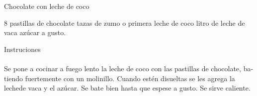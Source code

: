 \documentclass{article}
\begin{document}
  {\noindent \huge Chocolate con leche de coco}
  \vspace{1cm}

  \begin{multicols}{2}
  \noindent \color{light}
      8 pastillas de chocolate tazas de zumo o primera leche de coco litro de leche de vaca\newline
      azúcar a gusto.\newline
    \end{multicols}
  \vspace{1cm}

  {\noindent \LARGE Instruciones}\\
  \\
  \noindent \color{light} Se pone a cocinar a fuego lento la leche de coco con las pastillas de
chocolate, ba-tiendo fuertemente con un molinillo. Cuando estén
disueltas se les agrega la lechede vaca y el azú­car. Se bate bien hasta
que espese a gusto. Se sirve caliente.
\end{document}
